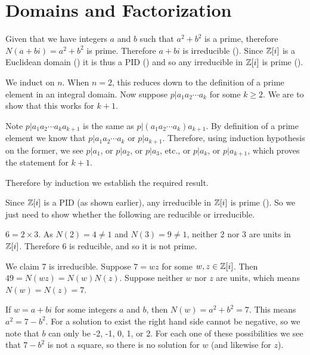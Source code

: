 \section{Domains and Factorization}
\begin{questions}
    \item Given that we have integers $a$ and $b$ such that $a^2 + b^2$ is a prime, therefore $N(a+bi) = a^2+b^2$ is prime. Therefore $a+bi$ is irreducible (). Since $\mathbb{Z}[i]$ is a Euclidean domain () it is thus a PID () and so any irreducible in $\mathbb{Z}[i]$ is prime ().
    
    \item We induct on $n$. When $n = 2$, this reduces down to the definition of a prime element in an integral domain. Now suppose $p \vert a_1a_2\cdots a_k$ for some $k \geq 2$. We are to show that this works for $k + 1$.
    
    Note $p \vert a_1a_2\cdots a_ka_{k+1}$ is the same as $p \vert (a_1a_2\cdots a_k)a_{k+1}$. By definition of a prime element we know that $p \vert a_1a_2\cdots a_k$ or $p \vert a_{k+1}$. Therefore, using induction hypothesis on the former, we see $p\vert a_1$, or $p\vert a_2$, or $p \vert a_3$, etc., or $p \vert a_k$, or $p \vert a_{k+1}$, which proves the statement for $k + 1$.

    Therefore by induction we establish the required result.

    \item Since $\mathbb{Z}[i]$ is a PID (as shown earlier), any irreducible in $\mathbb{Z}[i]$ is prime (). So we just need to show whether the following are reducible or irreducible.
    \begin{partquestions}{\alph*}
        \item $6 = 2 \times 3$. As $N(2) = 4 \neq 1$ and $N(3) = 9 \neq 1$, neither 2 nor 3 are units in $\mathbb{Z}[i]$. Therefore 6 is reducible, and so it is not prime.
        
        \item We claim 7 is irreducible. Suppose $7 = wz$ for some $w,z \in \mathbb{Z}[i]$. Then $49 = N(wz) = N(w)N(z)$. Suppose neither $w$ nor $z$ are units, which means $N(w) = N(z) = 7$.
        
        If $w = a+bi$ for some integers $a$ and $b$, then $N(w) = a^2+b^2 = 7$. This means $a^2 = 7 - b^2$. For a solution to exist the right hand side cannot be negative, so we note that $b$ can only be -2, -1, 0, 1, or 2. For each one of these possibilities we see that $7 - b^2$ is not a square, so there is no solution for $w$ (and likewise for $z$).


\end{partquestions}
\end{questions}
